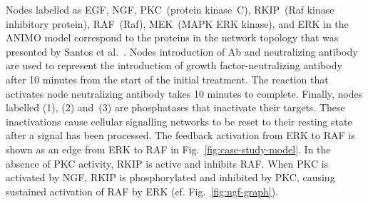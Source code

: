 \documentclass[journal, 10pt]{IEEEtran}
\begin{document}
Nodes labelled as {\sf EGF}, {\sf NGF}, {\sf PKC}~(protein kinase~C),
{\sf RKIP}~(Raf kinase inhibitory protein), {\sf RAF}~(Raf), {\sf MEK}~(MAPK ERK kinase), and {\sf ERK}
in the ANIMO model correspond to the proteins in the network topology that was presented by Santos et al.~\cite{egf-ngf}.
Nodes {\sf introduction of Ab} and {\sf neutralizing antibody} are used to represent
the introduction of growth factor-neutralizing antibody after 10 minutes from the start of the initial treatment.
The reaction that activates node {\sf neutralizing antibody} takes 10 minutes to complete.
Finally, nodes labelled {\sf (1)}, {\sf (2)} and~{\sf (3)} are phosphatases that inactivate their targets. 
These inactivations cause cellular signalling networks to be reset
to their resting state after a signal has been processed. 
The feedback activation from ERK to RAF is shown as an edge from ERK to RAF in Fig.~\ref{fig:case-study-model}.
In the absence of PKC activity, RKIP is active and inhibits RAF. When PKC is activated by NGF, RKIP is phosphorylated and inhibited by PKC,
causing sustained activation of RAF by ERK (cf. Fig.~\ref{fig:ngf-graph}).
\end{document}
